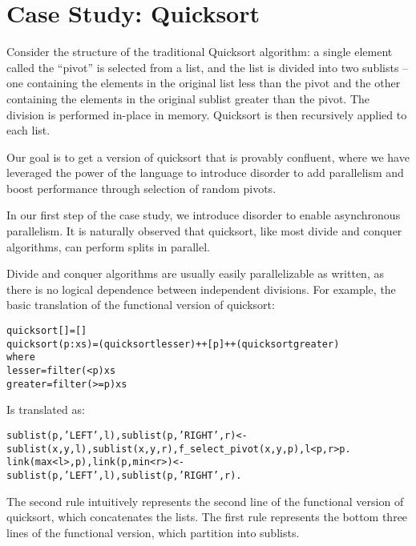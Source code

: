 \section{Case Study: Quicksort}
\label{sec:qscs}


Consider the structure of the traditional Quicksort algorithm: a single element called the “pivot” is selected from a list, and the list is divided into two sublists -- one containing the elements in the original list less than the pivot and the other containing the elements in the original sublist greater than the pivot.  The division is performed in-place in memory.  Quicksort is then recursively applied to each list.

Our goal is to get a version of quicksort that is provably confluent, where we have leveraged the power of the language to introduce disorder to add parallelism and boost performance through selection of random pivots.

In our first step of the case study, we introduce disorder to enable asynchronous parallelism.  It is naturally observed that quicksort, like most divide and conquer algorithms, can perform splits in parallel.

Divide and conquer algorithms are usually easily parallelizable as written, as there is no logical dependence between independent divisions.  For example, the basic translation of the functional version of quicksort:

\begin{alltt}
quicksort []     = []
quicksort (p:xs) = (quicksort lesser) ++ [p] ++ (quicksort greater)
    where
        lesser  = filter (< p) xs
        greater = filter (>= p) xs
\end{alltt}

Is translated as:

\begin{alltt}
sublist(p,'LEFT',l), sublist(p,'RIGHT',r) <- sublist(x,y,l), sublist(x,y,r), f_select_pivot(x,y,p), l < p, r > p.
link(max<l>,p), link(p,min<r>) <- sublist(p,'LEFT',l), sublist(p,'RIGHT',r).
\end{alltt}

The second rule intuitively represents the second line of the functional version of quicksort, which concatenates the lists.  The first rule represents the bottom three lines of the functional version, which partition into sublists.

